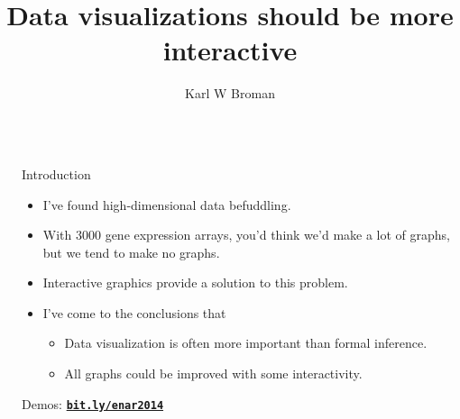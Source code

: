 \documentclass[final,plain]{beamer}
\title{Data visualizations should be more interactive}
\author{Karl W Broman}
\institute{Biostatistics \&
  Medical Informatics, University of Wisconsin--Madison}
\newlength{\sepwid}
\newlength{\onecolwid}
\newcommand{\bi}{\begin{itemize}}
\newcommand{\ei}{\end{itemize}}
\newcommand{\bluebold}{\color{dblue} \bf}
\newcommand{\colonevsep}{\vspace{18.5mm}}
\newcommand{\hilit}{\color{mypurple}}
\begin{document}
\begin{frame}[t]

\begin{columns}[t]
  \begin{column}{\sepwid}\end{column} %

  \begin{column}{\onecolwid}

    \begin{exampleblock}{\Large Introduction}{
        \bi \itemsep18pt
        \item I've found high-dimensional data {\hilit befuddling}.
        \item With 3000 gene expression arrays, you'd think we'd make
          {\hilit a lot} of graphs, but we tend to make {\hilit no} graphs.
        \item {\hilit Interactive graphics} provide a solution to this problem.
        \item I've come to the conclusions that
          \vspace{8pt}
           \bi \itemsep14pt
           \item Data visualization is often more important than
             formal inference.
           \item All graphs could be improved with some interactivity.
           \ei
        \ei

     \vspace{18pt}

        \centerline{Demos:
        \href{http://www.biostat.wisc.edu/~kbroman/posters/ENAR2014}{\tt \textbf{bit.ly/enar2014}}}

     }
    \end{exampleblock}


  \colonevsep %

\end{column}
\end{columns}
\end{frame}
\end{document}
